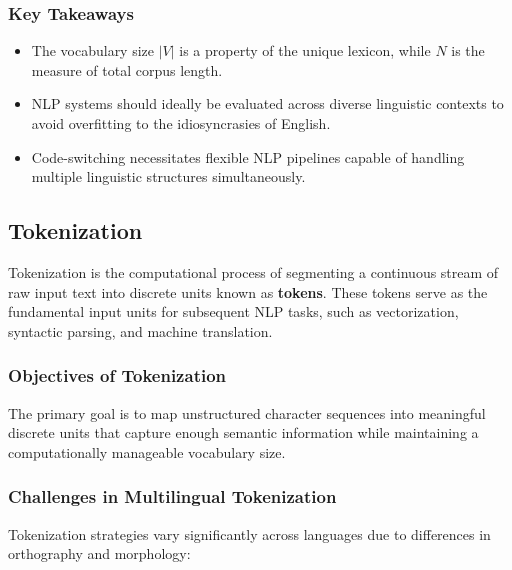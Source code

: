\documentclass[
  italian,
  11pt,
]{article}
\providecommand{\tightlist}{%
  \setlength{\itemsep}{0pt}\setlength{\parskip}{0pt}}
\begin{document}
\subsubsection{Key Takeaways}\label{key-takeaways}

\begin{itemize}
\tightlist
\item
  The vocabulary size \(|V|\) is a property of the unique lexicon, while
  \(N\) is the measure of total corpus length.
\item
  NLP systems should ideally be evaluated across diverse linguistic
  contexts to avoid overfitting to the idiosyncrasies of English.
\item
  Code-switching necessitates flexible NLP pipelines capable of handling
  multiple linguistic structures simultaneously.
\end{itemize}

\newpage

\subsection{Tokenization}\label{tokenization}

Tokenization is the computational process of segmenting a continuous
stream of raw input text into discrete units known as \textbf{tokens}.
These tokens serve as the fundamental input units for subsequent NLP
tasks, such as vectorization, syntactic parsing, and machine
translation.

\subsubsection{Objectives of
Tokenization}\label{objectives-of-tokenization}

The primary goal is to map unstructured character sequences into
meaningful discrete units that capture enough semantic information while
maintaining a computationally manageable vocabulary size.

\subsubsection{Challenges in Multilingual
Tokenization}\label{challenges-in-multilingual-tokenization}

Tokenization strategies vary significantly across languages due to
differences in orthography and morphology:
\end{document}

